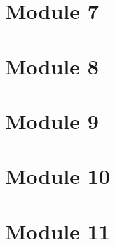 \documentclass[11pt,fleqn]{book} %
\begin{document}
\part{Module 7}


\part{Module 8}



\part{Module 9}



\part{Module 10}



\part{Module 11}

\end{document}
